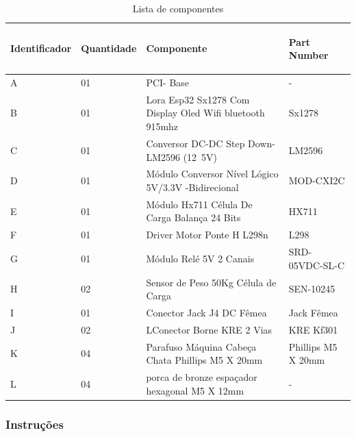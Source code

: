 \begin{table}[H]
\centering
\begin{tabular}{|m{1.9cm} |m{1.8cm} |m{7.3cm}|m{4cm}|}
\hline
\begin{center}Identificador\end{center} &\begin{center} Quantidade\end{center} & \begin{center}Componente\end{center} &\begin{center} Part Number\end{center} \\\hline
A&01 & PCI- Base & -  \\\hline
B &01&Lora Esp32 Sx1278 Com Display  Oled Wifi bluetooth 915mhz& Sx1278 \\\hline
 
C&01 &  Conversor DC-DC Step Down-LM2596 (12~5V)
& LM2596 \\\hline

D&01&Módulo Conversor Nível Lógico 5V/3.3V -Bidirecional&  MOD-CXI2C \\\hline

E&01&Módulo Hx711 Célula De Carga Balança 24 Bits & HX711 \\\hline

F&01& Driver Motor Ponte H L298n & L298 \\\hline

G&01 &  Módulo Relé 5V 2 Canais &   SRD-05VDC-SL-C \\\hline

H &02& Sensor de Peso 50Kg Célula de Carga & SEN-10245\\\hline

I&01 & Conector Jack J4 DC Fêmea &  Jack Fêmea  \\\hline

J&02&LConector Borne KRE 2 Vias & KRE Kf301 \\\hline

K&04&Parafuso Máquina Cabeça Chata Phillips M5 X 20mm &  Phillips M5 X 20mm \\\hline

L&04& porca de bronze espaçador hexagonal M5 X 12mm & -  \\\hline

\end{tabular}
\caption{Lista de componentes}
\end{table}


\subsubsection{Instruções}

